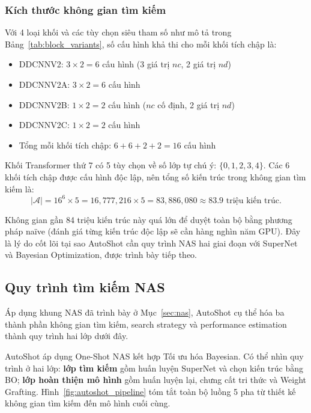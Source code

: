 \subsubsection{Kích thước không gian tìm kiếm}
\label{subsubsec:search_space_size}

Với 4 loại khối và các tùy chọn siêu tham số như mô tả trong Bảng~\ref{tab:block_variants}, số cấu hình khả thi cho mỗi khối tích chập là:
\begin{itemize}
    \item DDCNNV2: $3 \times 2 = 6$ cấu hình (3 giá trị $nc$, 2 giá trị $nd$)
    \item DDCNNV2A: $3 \times 2 = 6$ cấu hình
    \item DDCNNV2B: $1 \times 2 = 2$ cấu hình ($nc$ cố định, 2 giá trị $nd$)
    \item DDCNNV2C: $1 \times 2 = 2$ cấu hình
    \item Tổng mỗi khối tích chập: $6 + 6 + 2 + 2 = 16$ cấu hình
\end{itemize}

Khối Transformer thứ 7 có 5 tùy chọn về số lớp tự chú ý: $\{0, 1, 2, 3, 4\}$. Các 6 khối tích chập được cấu hình độc lập, nên tổng số kiến trúc trong không gian tìm kiếm là:
\begin{equation}
    |\mathcal{A}| = 16^6 \times 5 = 16{,}777{,}216 \times 5 = 83{,}886{,}080 \approx 83.9 \text{ triệu kiến trúc.}
    \label{eq:search_space_size}
\end{equation}

Không gian gần 84 triệu kiến trúc này quá lớn để duyệt toàn bộ bằng phương pháp naïve (đánh giá từng kiến trúc độc lập sẽ cần hàng nghìn năm GPU). Đây là lý do cốt lõi tại sao AutoShot cần quy trình NAS hai giai đoạn với SuperNet và Bayesian Optimization, được trình bày tiếp theo.

\subsection{Quy trình tìm kiếm NAS}
\label{subsec:autoshot_nas}

Áp dụng khung NAS đã trình bày ở Mục~\ref{sec:nas}, AutoShot cụ thể hóa ba thành phần không gian tìm kiếm, search strategy và performance estimation thành quy trình hai lớp dưới đây.

AutoShot áp dụng One-Shot NAS kết hợp Tối ưu hóa Bayesian. Có thể nhìn quy trình ở hai lớp: \textbf{lớp tìm kiếm} gồm huấn luyện SuperNet và chọn kiến trúc bằng BO; \textbf{lớp hoàn thiện mô hình} gồm huấn luyện lại, chưng cất tri thức và Weight Grafting. Hình~\ref{fig:autoshot_pipeline} tóm tắt toàn bộ luồng 5 pha từ thiết kế không gian tìm kiếm đến mô hình cuối cùng.

